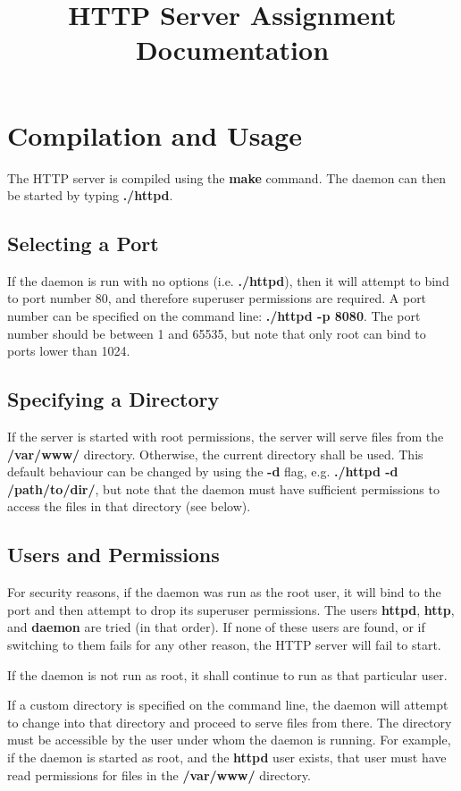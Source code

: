 \documentclass[a4paper]{article}
\title{HTTP Server Assignment \\
  \large Documentation}
\date{}
\author{}
\begin{document}
\maketitle

\section{Compilation and Usage}
The HTTP server is compiled using the {\bf make} command. The daemon can then
be started by typing {\bf ./httpd}.

\subsection{Selecting a Port}
If the daemon is run with no options (i.e. {\bf ./httpd}), then it will
attempt to bind to port number 80, and therefore superuser permissions are
required. A port number can be specified on the command line: {\bf ./httpd -p
  8080}. The port number should be between 1 and 65535, but note that only root
can bind to ports lower than 1024.

\subsection{Specifying a Directory}
If the server is started with root permissions, the server will serve files from
the {\bf /var/www/} directory. Otherwise, the current directory shall be
used. This default behaviour can be changed by using the {\bf -d} flag,
e.g. {\bf ./httpd -d /path/to/dir/}, but note that the daemon must have
sufficient permissions to access the files in that directory (see below).

\subsection{Users and Permissions}
For security reasons, if the daemon was run as the root user, it will bind to
the port and then attempt to drop its superuser permissions. The users {\bf
  httpd}, {\bf http}, and {\bf daemon} are tried (in that order). If none of
these users are found, or if switching to them fails for any other reason, the
HTTP server will fail to start.

If the daemon is not run as root, it shall continue to run as that particular
user.

If a custom directory is specified on the command line, the daemon will attempt
to change into that directory and proceed to serve files from there. The
directory must be accessible by the user under whom the daemon is running. For
example, if the daemon is started as root, and the {\bf httpd} user exists,
that user must have read permissions for files in the {\bf /var/www/}
directory.
\end{document}
